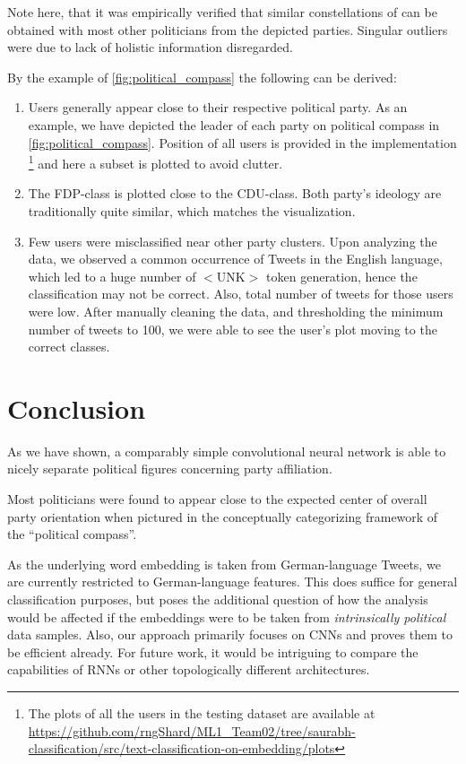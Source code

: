 \documentclass[10pt, oneside]{article}
\begin{document}
\begin{multicols}{2}
Note here, that it was empirically verified that similar constellations of can be obtained with most other politicians from the depicted parties. Singular outliers were due to lack of holistic information disregarded.

By the example of \autoref{fig:political_compass} the following can be derived:

\begin{enumerate}
	\item Users generally appear close to their respective political party. As an example, we have depicted the leader of each party on political compass in \autoref{fig:political_compass}. Position of all users is provided in the implementation \footnote{ The plots of all the users in the testing dataset are available at \url{https://github.com/rngShard/ML1_Team02/tree/saurabh-classification/src/text-classification-on-embedding/plots}  } and here a subset is plotted to avoid clutter.
	\item The FDP-class is plotted close to the CDU-class. Both party's ideology are traditionally quite similar, which matches the visualization.
	\item Few users were misclassified near other party clusters. Upon analyzing the data, we observed a common occurrence  of Tweets in the English language, which led to a huge number of $<$UNK$>$ token generation, hence the classification may not be correct. Also, total number of tweets for those users were low. After manually cleaning the data, and thresholding the minimum number of tweets to 100, we were able to see the user's plot moving to the correct classes.
\end{enumerate}

\section{Conclusion}

As we have shown, a comparably simple convolutional neural network is able to nicely separate political figures concerning party affiliation.

Most politicians were found to appear close to the expected center of overall party orientation when pictured in the conceptually categorizing framework of the ``political compass''.

As the underlying word embedding is taken from German-language Tweets, we are currently restricted to German-language features. This does suffice for general classification purposes, but poses the additional question of how the analysis would be affected if the embeddings were to be taken from \emph{intrinsically political} data samples. 
Also, our approach primarily focuses on CNNs and proves them to be efficient already. For future work, it would be intriguing to compare the capabilities of RNNs or other topologically different architectures. 

\end{multicols}

\newpage



\end{document}
